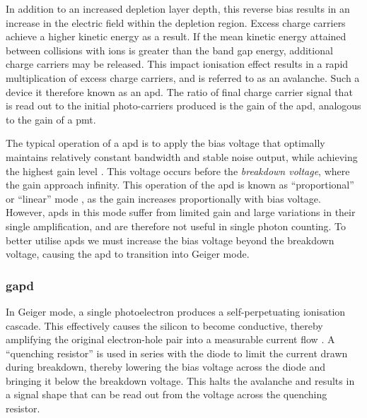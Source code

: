 In addition to an increased depletion layer depth, this reverse bias results in an increase in the electric field within the depletion region. Excess charge carriers achieve a higher kinetic energy as a result. If the mean kinetic energy attained between collisions with ions is greater than the band gap energy, additional charge carriers may be released. This impact ionisation effect results in a rapid multiplication of excess charge carriers, and is referred to as an avalanche. Such a device it therefore known as an \gls{apd}. The ratio of final charge carrier signal that is read out to the initial photo-carriers produced is the gain of the \gls{apd}, analogous to the gain of a \gls{pmt}.

The typical operation of a \gls{apd} is to apply the bias voltage that optimally maintains relatively constant bandwidth and stable noise output, while achieving the highest gain level \cite{Ghassemi2017}. This voltage occurs before the \textit{breakdown voltage}, where the gain approach infinity. This operation of the \gls{apd} is known as ``proportional'' or ``linear'' mode \cite{Otte2006}, as the gain increases proportionally with bias voltage. However, \glspl{apd} in this mode suffer from limited gain and large variations in their single amplification, and are therefore not useful in single photon counting. To better utilise \glspl{apd} we must increase the bias voltage beyond the breakdown voltage, causing the \gls{apd} to transition into Geiger mode.

\subsubsection{\gls{gapd}}

In Geiger mode, a single photoelectron produces a self-perpetuating ionisation cascade. This effectively causes the silicon to become conductive, thereby amplifying the original electron-hole pair into a measurable current flow \cite{SensL2011}. A ``quenching resistor'' is used in series with the diode to limit the current drawn during breakdown, thereby lowering the bias voltage across the diode and bringing it below the breakdown voltage. This halts the avalanche and results in a signal shape that can be read out from the voltage across the quenching resistor.


